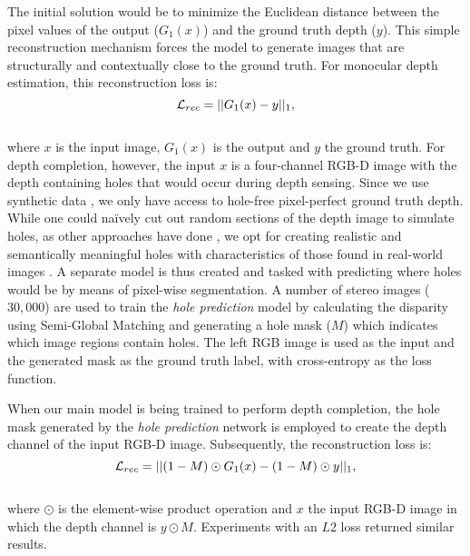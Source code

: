 \documentclass[10pt,twocolumn,letterpaper]{article}
\begin{document}
The initial solution would be to minimize the Euclidean distance between the pixel values of the output ($G_1(x)$) and the ground truth depth ($y$). This simple reconstruction mechanism forces the model to generate images that are structurally and contextually close to the ground truth. For monocular depth estimation, this reconstruction loss is:\vspace{-0.15cm}\begin{equation}  
\mathcal{L}_{rec}  = ||G_1(x) - y ||_{1},
\label{lossRec_estimation}\vspace{-0.6cm}
\end{equation}\\
where $x$ is the input image, $G_1(x)$ is the output and $y$ the ground truth. For depth completion, however, the input $x$ is a four-channel RGB-D image with the depth containing holes that would occur during depth sensing. Since we use synthetic data \cite{RosCVPR16}, we only have access to hole-free pixel-perfect ground truth depth. While one could na\"ively cut out random sections of the depth image to simulate holes, as other approaches have done \cite{pathak2016context, yeh2017semantic}, we opt for creating realistic and semantically meaningful holes with characteristics of those found in real-world images \cite{abarghouei18review}. A separate model is thus created and tasked with predicting where holes would be by means of pixel-wise segmentation. A number of stereo images ($30,000$) \cite{Geiger2013IJRR} are used to train the \textit{hole prediction} model by calculating the disparity using Semi-Global Matching \cite{hirschmuller2008stereo} and generating a hole mask ($M$) which indicates which image regions contain holes. The left RGB image is used as the input and the generated mask as the ground truth label, with cross-entropy as the loss function.

When our main model is being trained to perform depth completion, the hole mask generated by the \textit{hole prediction} network is employed to create the depth channel of the input RGB-D image. Subsequently, the reconstruction loss is:\vspace{-0.10cm}
\begin{equation}  
\mathcal{L}_{rec}  = ||(1 - M) \odot G_1(x) - (1 - M) \odot y ||_{1},
\label{lossRec_compltion}\vspace{-0.5cm}
\end{equation}\\
where $\odot$ is the element-wise product operation and $x$ the input RGB-D image in which the depth channel is $y \odot M$. Experiments with an $L2$ loss returned similar results.
\end{document}
